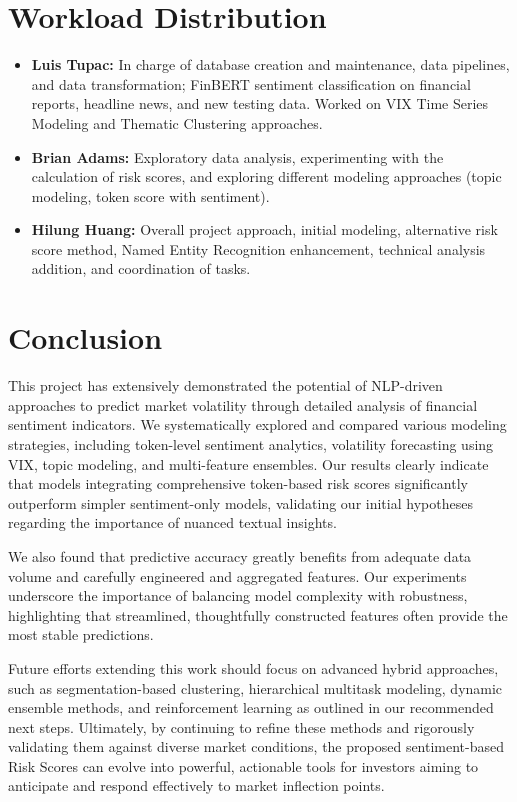 \documentclass[twocolumn]{article}
\begin{document}
\section{Workload Distribution}
\begin{itemize}
    \item \textbf{Luis Tupac:} In charge of database creation and maintenance, data pipelines, and data transformation; FinBERT sentiment classification on financial reports, headline news, and new testing data. Worked on VIX Time Series Modeling and Thematic Clustering approaches. 
    \item \textbf{Brian Adams:} Exploratory data analysis, experimenting with the calculation of risk scores, and exploring different modeling approaches (topic modeling, token score with sentiment).
    \item \textbf{Hilung Huang:} Overall project approach, initial modeling, alternative risk score method, Named Entity Recognition enhancement, technical analysis addition, and coordination of tasks.
\end{itemize}

\section{Conclusion}

This project has extensively demonstrated the potential of NLP-driven approaches to predict market volatility through detailed analysis of financial sentiment indicators. We systematically explored and compared various modeling strategies, including token-level sentiment analytics, volatility forecasting using VIX, topic modeling, and multi-feature ensembles. Our results clearly indicate that models integrating comprehensive token-based risk scores significantly outperform simpler sentiment-only models, validating our initial hypotheses regarding the importance of nuanced textual insights.

We also found that predictive accuracy greatly benefits from adequate data volume and carefully engineered and aggregated features. Our experiments underscore the importance of balancing model complexity with robustness, highlighting that streamlined, thoughtfully constructed features often provide the most stable predictions.

Future efforts extending this work should focus on advanced hybrid approaches, such as segmentation-based clustering, hierarchical multitask modeling, dynamic ensemble methods, and reinforcement learning as outlined in our recommended next steps. Ultimately, by continuing to refine these methods and rigorously validating them against diverse market conditions, the proposed sentiment-based Risk Scores can evolve into powerful, actionable tools for investors aiming to anticipate and respond effectively to market inflection points.
\end{document}
